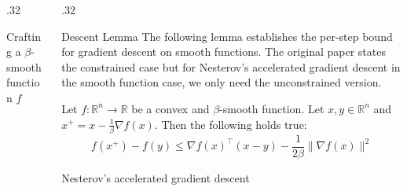\documentclass[final,t]{beamer}
\newcommand{\norm}[2][]{#1\lVert #2 #1\rVert}
\begin{document}
\begin{frame}[containsverbatim]
\begin{columns}[t]
\begin{column}{.32\linewidth}
\begin{exampleblock}{Crafting a $\beta$-smooth function $f$}
    \end{exampleblock}

\end{column}




\begin{column}{.32\linewidth}
\vspace{-10mm}




\begin{exampleblock}{Descent Lemma}
The following lemma establishes the per-step bound for gradient descent on smooth functions. The original
paper states the constrained case but for Nesterov's accelerated gradient descent in the smooth
function case, we only need the unconstrained version.
\begin{lemma}[\bf 2]\label{lemma:3.6}
Let $f:\mathbb{R}^n \rightarrow \mathbb{R}$ be a convex and $\beta$-smooth function. Let $x, y \in \mathbb{R}^n$ and $x^+ = x - \frac{1}{\beta}\nabla f(x)$.
Then the following holds true:
\begin{equation*}
  f(x^+) - f(y) \leq \nabla f(x)^\top (x - y) - \frac{1}{2\beta}\norm{\nabla f(x)}^2
\end{equation*}
\end{lemma}
\end{exampleblock}




\begin{exampleblock}{Nesterov's accelerated gradient descent}


\end{exampleblock}
\end{column}
\end{columns}
\end{frame}
\end{document}
